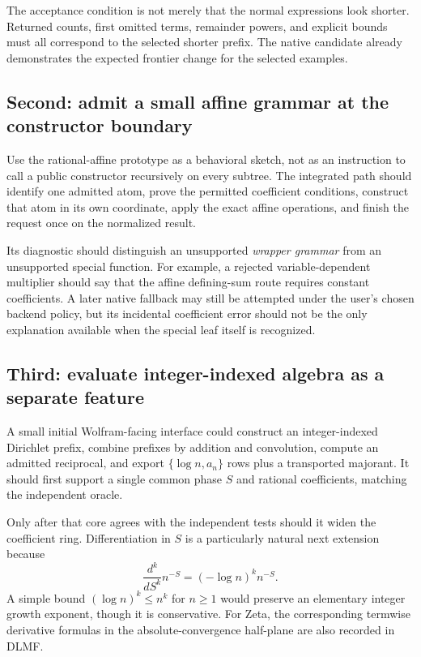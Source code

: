 \documentclass[11pt,letterpaper]{article}
\begin{document}
The acceptance condition is not merely that the normal expressions look
shorter. Returned counts, first omitted terms, remainder powers, and explicit
bounds must all correspond to the selected shorter prefix. The native candidate
already demonstrates the expected frontier change for the selected examples.

\subsection{Second: admit a small affine grammar at the constructor boundary}
Use the rational-affine prototype as a behavioral sketch, not as an instruction
to call a public constructor recursively on every subtree. The integrated path
should identify one admitted atom, prove the permitted coefficient conditions,
construct that atom in its own coordinate, apply the exact affine operations,
and finish the request once on the normalized result.

Its diagnostic should distinguish an unsupported \emph{wrapper grammar} from
an unsupported special function. For example, a rejected variable-dependent
multiplier should say that the affine defining-sum route requires constant
coefficients. A later native fallback may still be attempted under the user's
chosen backend policy, but its incidental coefficient error should not be the
only explanation available when the special leaf itself is recognized.

\subsection{Third: evaluate integer-indexed algebra as a separate feature}
A small initial Wolfram-facing interface could construct an integer-indexed
Dirichlet prefix, combine prefixes by addition and convolution, compute an
admitted reciprocal, and export $\{\log n,a_n\}$ rows plus a transported
majorant. It should first support a single common phase $S$ and rational
coefficients, matching the independent oracle.

Only after that core agrees with the independent tests should it widen the
coefficient ring. Differentiation in $S$ is a particularly natural next
extension because
\begin{equation}
 \frac{d^k}{dS^k}n^{-S}=(-\log n)^k n^{-S}.
\end{equation}
A simple bound $(\log n)^k\leq n^k$ for $n\geq1$ would preserve an elementary
integer growth exponent, though it is conservative. For Zeta, the corresponding
termwise derivative formulas in the absolute-convergence half-plane are also
recorded in DLMF.~\cite{dlmf-zeta}
\end{document}
